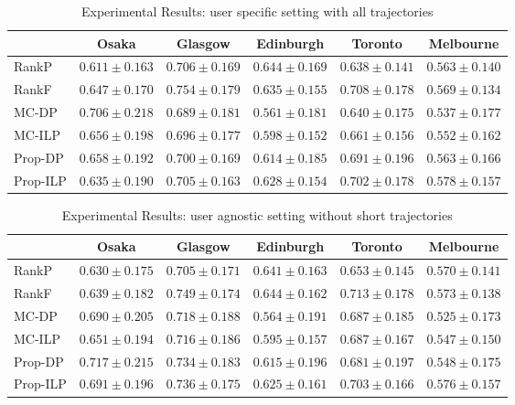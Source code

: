 \begin{table*}
    \centering
    \caption{Experimental Results: user specific setting with all trajectories}
    \begin{tabular}{l|ccccc} \hline
         & Osaka & Glasgow & Edinburgh & Toronto & Melbourne \\ \hline
        RankP & $0.611\pm0.163$ & $0.706\pm0.169$ & $\mathbf{0.644\pm0.169}$ & $0.638\pm0.141$ & $0.563\pm0.140$ \\
        RankF & $0.647\pm0.170$ & $\mathbf{0.754\pm0.179}$ & $0.635\pm0.155$ & $\mathbf{0.708\pm0.178}$ & $0.569\pm0.134$ \\
        MC-DP & $\mathbf{0.706\pm0.218}$ & $0.689\pm0.181$ & $0.561\pm0.181$ & $0.640\pm0.175$ & $0.537\pm0.177$ \\
        MC-ILP & $0.656\pm0.198$ & $0.696\pm0.177$ & $0.598\pm0.152$ & $0.661\pm0.156$ & $0.552\pm0.162$ \\
        Prop-DP & $0.658\pm0.192$ & $0.700\pm0.169$ & $0.614\pm0.185$ & $0.691\pm0.196$ & $0.563\pm0.166$ \\
        Prop-ILP & $0.635\pm0.190$ & $0.705\pm0.163$ & $0.628\pm0.154$ & $0.702\pm0.178$ & $\mathbf{0.578\pm0.157}$ \\
        \hline
    \end{tabular}
\end{table*}

\begin{table*}
    \centering
    \caption{Experimental Results: user agnostic setting without short trajectories}
    \begin{tabular}{l|ccccc} \hline
         & Osaka & Glasgow & Edinburgh & Toronto & Melbourne \\ \hline
        RankP & $0.630\pm0.175$ & $0.705\pm0.171$ & $0.641\pm0.163$ & $0.653\pm0.145$ & $0.570\pm0.141$ \\
        RankF & $0.639\pm0.182$ & $\mathbf{0.749\pm0.174}$ & $\mathbf{0.644\pm0.162}$ & $\mathbf{0.713\pm0.178}$ & $0.573\pm0.138$ \\
        MC-DP & $0.690\pm0.205$ & $0.718\pm0.188$ & $0.564\pm0.191$ & $0.687\pm0.185$ & $0.525\pm0.173$ \\
        MC-ILP & $0.651\pm0.194$ & $0.716\pm0.186$ & $0.595\pm0.157$ & $0.687\pm0.167$ & $0.547\pm0.150$ \\
        Prop-DP & $\mathbf{0.717\pm0.215}$ & $0.734\pm0.183$ & $0.615\pm0.196$ & $0.681\pm0.197$ & $0.548\pm0.175$ \\
        Prop-ILP & $0.691\pm0.196$ & $0.736\pm0.175$ & $0.625\pm0.161$ & $0.703\pm0.166$ & $\mathbf{0.576\pm0.157}$ \\
        \hline
    \end{tabular}
\end{table*}

